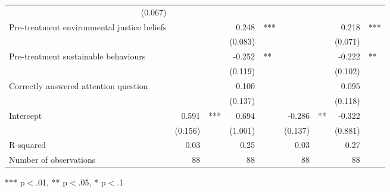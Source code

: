 \documentclass{article}
\begin{document}
\begin{table}[!h]
\begin{tabular}{lllllllll}
  \multicolumn{1}{r}{(0.067)} &
  \multicolumn{1}{l}{} \\
\multicolumn{1}{l}{Pre-treatment environmental justice beliefs} &
  \multicolumn{1}{r}{} &
  \multicolumn{1}{l}{} &
  \multicolumn{1}{r}{0.248} &
  \multicolumn{1}{l}{***} &
  \multicolumn{1}{r}{} &
  \multicolumn{1}{l}{} &
  \multicolumn{1}{r}{0.218} &
  \multicolumn{1}{l}{***} \\
\multicolumn{1}{l}{} &
  \multicolumn{1}{r}{} &
  \multicolumn{1}{l}{} &
  \multicolumn{1}{r}{(0.083)} &
  \multicolumn{1}{l}{} &
  \multicolumn{1}{r}{} &
  \multicolumn{1}{l}{} &
  \multicolumn{1}{r}{(0.071)} &
  \multicolumn{1}{l}{} \\
\multicolumn{1}{l}{Pre-treatment sustainable behaviours} &
  \multicolumn{1}{r}{} &
  \multicolumn{1}{l}{} &
  \multicolumn{1}{r}{-0.252} &
  \multicolumn{1}{l}{**} &
  \multicolumn{1}{r}{} &
  \multicolumn{1}{l}{} &
  \multicolumn{1}{r}{-0.222} &
  \multicolumn{1}{l}{**} \\
\multicolumn{1}{l}{} &
  \multicolumn{1}{r}{} &
  \multicolumn{1}{l}{} &
  \multicolumn{1}{r}{(0.119)} &
  \multicolumn{1}{l}{} &
  \multicolumn{1}{r}{} &
  \multicolumn{1}{l}{} &
  \multicolumn{1}{r}{(0.102)} &
  \multicolumn{1}{l}{} \\
\multicolumn{1}{l}{Correctly answered attention question} &
  \multicolumn{1}{r}{} &
  \multicolumn{1}{l}{} &
  \multicolumn{1}{r}{0.100} &
  \multicolumn{1}{l}{} &
  \multicolumn{1}{r}{} &
  \multicolumn{1}{l}{} &
  \multicolumn{1}{r}{0.095} &
  \multicolumn{1}{l}{} \\
\multicolumn{1}{l}{} &
  \multicolumn{1}{r}{} &
  \multicolumn{1}{l}{} &
  \multicolumn{1}{r}{(0.137)} &
  \multicolumn{1}{l}{} &
  \multicolumn{1}{r}{} &
  \multicolumn{1}{l}{} &
  \multicolumn{1}{r}{(0.118)} &
  \multicolumn{1}{l}{} \\
\multicolumn{1}{l}{Intercept} &
  \multicolumn{1}{r}{0.591} &
  \multicolumn{1}{l}{***} &
  \multicolumn{1}{r}{0.694} &
  \multicolumn{1}{l}{} &
  \multicolumn{1}{r}{-0.286} &
  \multicolumn{1}{l}{**} &
  \multicolumn{1}{r}{-0.322} &
  \multicolumn{1}{l}{} \\
\multicolumn{1}{l}{} &
  \multicolumn{1}{r}{(0.156)} &
  \multicolumn{1}{l}{} &
  \multicolumn{1}{r}{(1.001)} &
  \multicolumn{1}{l}{} &
  \multicolumn{1}{r}{(0.137)} &
  \multicolumn{1}{l}{} &
  \multicolumn{1}{r}{(0.881)} &
  \multicolumn{1}{l}{} \\
\multicolumn{1}{l}{R-squared} &
  \multicolumn{1}{r}{0.03} &
  \multicolumn{1}{l}{} &
  \multicolumn{1}{r}{0.25} &
  \multicolumn{1}{l}{} &
  \multicolumn{1}{r}{0.03} &
  \multicolumn{1}{l}{} &
  \multicolumn{1}{r}{0.27} &
  \multicolumn{1}{l}{} \\
\multicolumn{1}{l}{Number of observations} &
  \multicolumn{1}{r}{88} &
  \multicolumn{1}{l}{} &
  \multicolumn{1}{r}{88} &
  \multicolumn{1}{l}{} &
  \multicolumn{1}{r}{88} &
  \multicolumn{1}{l}{} &
  \multicolumn{1}{r}{88} &
  \multicolumn{1}{l}{} \\
\cline{1-9}
\end{tabular}

\footnotesize{
*** p$<$.01, ** p$<$.05, * p$<$.1
}
\end{table}
\end{document}
